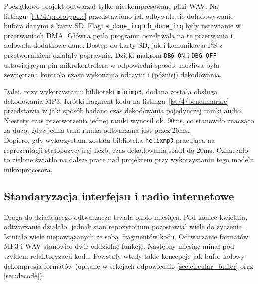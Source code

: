 \documentclass[12pt]{report}
\newcommand{\isqs}{$\text{I}^{2}\text{S}$}
\newcommand{\lstfile}[3]{
	\noindent
	\hspace{0.1\linewidth}
	\begin{minipage}{0.8\linewidth}
		
	\end{minipage}
	\vspace{0.3cm}
}
\begin{document}
			\lstfile{c}{Realizacja podstawowego ładowania bufora}{lst/4/prototype.c}
			
			Początkowo projekt odtwarzał tylko nieskompresowane pliki WAV. Na listingu~\ref{lst/4/prototype.c} przedstawiono jak odbywało się doładowywanie bufora danymi z karty SD. Flagi \lstinline|a_done_irq| i \lstinline|b_done_irq| były ustawianie w przerwaniach DMA. Główna pętla programu oczekiwała na te przerwania i ładowała dodatkowe dane. Dostęp do karty SD, jak i komunikacja \isqs{} z przetwornikiem działały poprawnie. Dzięki makrom \lstinline|DBG_ON| i \lstinline|DBG_OFF| ustawiającym pin mikrokontrolera w odpowiedni sposób, możliwa była zewnętrzna kontrola czasu wykonania odczytu i (później) dekodowania.
			
			\lstfile{c}{Pomiar czasu dekodowania ramki MP3}{lst/4/benchmark.c}
			
			Dalej, przy wykorzystaniu biblioteki \lstinline|minimp3|\textsuperscript{\cite{minimp3}}, dodana została obsługa dekodowania MP3. Krótki fragment kodu na listingu~\ref{lst/4/benchmark.c} przedstawia w jaki sposób badano czas dekodowania pojedynczej ramki audio. Niestety czas przetworzenia jednej ramki wynosił ok. 90ms, co stanowiło znacząco za dużo, gdyż jedna taka ramka odtwarzana jest przez 26ms.
			$ $\\
			
			Dopiero, gdy wykorzystana została biblioteka \lstinline|helixmp3| pracująca na reprezentacji stałopozycyjnej liczb, czas dekodowania spadł do 20ms. Oznaczało to zielone światło na dalsze prace nad projektem przy wykorzystaniu tego modelu mikroprocesora.
			
		\subsection{Standaryzacja interfejsu i radio internetowe}
			Droga do działającego odtwarzacza trwała około miesiąca. Pod koniec kwietnia, odtwarzanie działało, jednak stan repozytorium pozostawiał wiele do życzenia. Istniało wiele niepowiązanych ze sobą fragmentów kodu. Odtwarzanie formatów MP3 i WAV stanowiło dwie oddzielne funkcje. Następny miesiąc minał pod szyldem refaktoryzacji kodu. Powstały wtedy takie koncepcje jak bufor kołowy dekompresja formatów (opisane w sekcjach odpowiednio \ref{sec:circular_buffer} oraz \ref{sec:decode}).
			$ $\\
			
\end{document}
